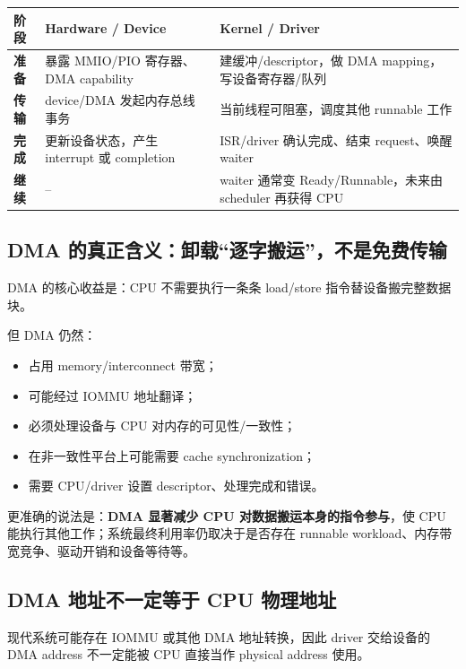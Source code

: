 \documentclass[11pt,a4paper]{ctexart}
\newcommand{\kw}[1]{\textbf{#1}}
\begin{document}
\begin{center}
\small
\renewcommand{\arraystretch}{1.25}
\begin{tabularx}{\linewidth}{>{\bfseries}p{2.7cm} X X}
\toprule
阶段 & Hardware / Device & Kernel / Driver\\
\midrule
准备 & 暴露 MMIO/PIO 寄存器、DMA capability & 建缓冲/descriptor，做 DMA mapping，写设备寄存器/队列\\
传输 & device/DMA 发起内存总线事务 & 当前线程可阻塞，调度其他 runnable 工作\\
完成 & 更新设备状态，产生 interrupt 或 completion & ISR/driver 确认完成、结束 request、唤醒 waiter\\
继续 & -- & waiter 通常变 Ready/Runnable，未来由 scheduler 再获得 CPU\\
\bottomrule
\end{tabularx}
\end{center}

\subsection{DMA 的真正含义：卸载“逐字搬运”，不是免费传输}
DMA 的核心收益是：CPU 不需要执行一条条 load/store 指令替设备搬完整数据块。

但 DMA 仍然：
\begin{itemize}
  \item 占用 memory/interconnect 带宽；
  \item 可能经过 IOMMU 地址翻译；
  \item 必须处理设备与 CPU 对内存的可见性/一致性；
  \item 在非一致性平台上可能需要 cache synchronization；
  \item 需要 CPU/driver 设置 descriptor、处理完成和错误。
\end{itemize}

\begin{warn}
更准确的说法是：\kw{DMA 显著减少 CPU 对数据搬运本身的指令参与}，使 CPU 能执行其他工作；系统最终利用率仍取决于是否存在 runnable workload、内存带宽竞争、驱动开销和设备等待等。
\end{warn}

\subsection{DMA 地址不一定等于 CPU 物理地址}
现代系统可能存在 IOMMU 或其他 DMA 地址转换，因此 driver 交给设备的 DMA address 不一定能被 CPU 直接当作 physical address 使用。
\end{document}
